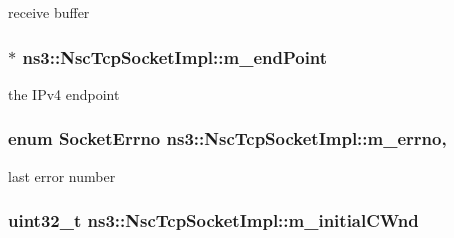receive buffer 

\subsubsection[{\texorpdfstring{m\+\_\+end\+Point}{m_endPoint}}]{$\ast$ ns3\+::\+Nsc\+Tcp\+Socket\+Impl\+::m\+\_\+end\+Point\hspace{0.3cm}{\ttfamily [private]}}\hypertarget{classns3_1_1NscTcpSocketImpl_a42d224bda60f7e75d28f3952f27d1a9c}{}\label{classns3_1_1NscTcpSocketImpl_a42d224bda60f7e75d28f3952f27d1a9c}


the I\+Pv4 endpoint 

\subsubsection[{\texorpdfstring{m\+\_\+errno}{m_errno}}]{\setlength{\rightskip}{0pt plus 5cm}enum {\bf Socket\+Errno} ns3\+::\+Nsc\+Tcp\+Socket\+Impl\+::m\+\_\+errno\hspace{0.3cm}{\ttfamily [mutable]}, {\ttfamily [private]}}\hypertarget{classns3_1_1NscTcpSocketImpl_a0b99e66d2b5eb67310a29b3ab39f53a7}{}\label{classns3_1_1NscTcpSocketImpl_a0b99e66d2b5eb67310a29b3ab39f53a7}


last error number 

\subsubsection[{\texorpdfstring{m\+\_\+initial\+C\+Wnd}{m_initialCWnd}}]{\setlength{\rightskip}{0pt plus 5cm}uint32\+\_\+t ns3\+::\+Nsc\+Tcp\+Socket\+Impl\+::m\+\_\+initial\+C\+Wnd\hspace{0.3cm}{\ttfamily [private]}}\hypertarget{classns3_1_1NscTcpSocketImpl_adbbb7b9ef71615ae975409fe09bc9964}{}\label{classns3_1_1NscTcpSocketImpl_adbbb7b9ef71615ae975409fe09bc9964}


